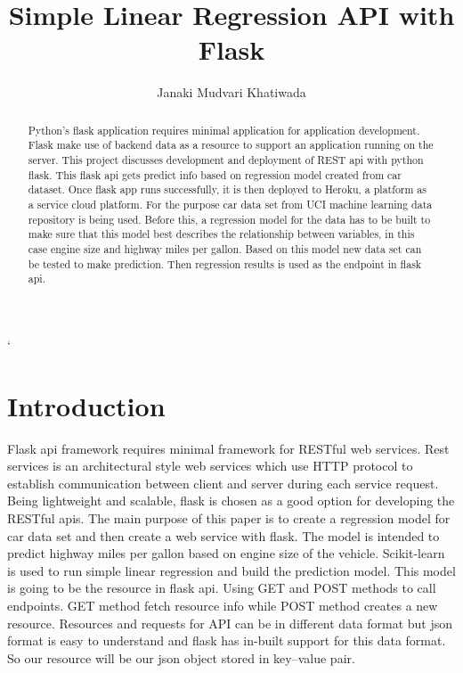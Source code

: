 \title{Simple Linear Regression API with Flask}



\author{Janaki Mudvari Khatiwada}


\renewcommand{\shortauthors}{J. M. Khatiwada}



\begin{abstract}
  Python's flask application requires minimal application for application
  development. Flask make use of backend data as a resource to support an
  application running on the server. This project discusses development
  and deployment of REST api with python flask. This flask api gets predict
  info based on regression model created from car dataset. Once flask app runs 
  successfully, it is then deployed to Heroku, a platform as a service 
  cloud platform. For the purpose car data set from UCI machine learning
  data repository is being used. Before this, a regression model for the
  data has to be built to make sure that this model best describes the 
  relationship between variables, in this case engine size and highway
  miles per gallon. Based on this model new data set can be tested to make 
  prediction. Then regression results is used as the endpoint 
  in flask api.
   
\end{abstract}



\maketitle`

\section{Introduction}
  Flask api framework requires minimal framework for RESTful web services.
  Rest services is an architectural style web services which use HTTP protocol
  to establish communication between client and server during each service
  request.
  Being lightweight and scalable, flask is chosen as a good option for 
  developing the RESTful apis.  The main purpose of this paper is
  to create a regression model for car data set and then create a web service
  with flask. The model is intended to
  predict highway miles per gallon based on engine size of the vehicle.
  Scikit-learn is used to run simple linear regression and build the prediction
  model. This model is going
  to be the resource in flask api. Using GET and POST methods to call
  endpoints. GET method fetch resource info while POST method creates
  a new resource. Resources and requests for API can be in different data
  format but json format
  is easy to understand and flask has in-built support for this data format. So 
  our resource will be our json object stored in key--value pair.
  
